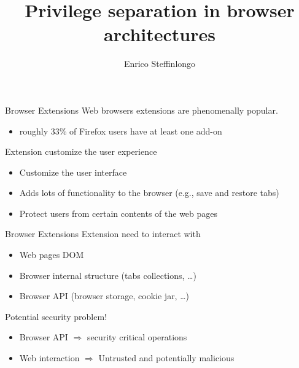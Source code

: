\documentclass[11pt]{beamer}
\author{Enrico Steffinlongo}
\title{Privilege separation in browser architectures}
\institute[Universities Here and There] %
{
  Università Ca' Foscari - Computer science
}
\begin{document}
\begin{frame}
\titlepage
\end{frame}


\begin{frame}
\tableofcontents
\end{frame}

\begin{frame}{Browser Extensions}
Web browsers extensions are phenomenally popular.
\begin{itemize}
\item roughly 33\% of Firefox users have at least one add-on
\end{itemize}
Extension customize the user experience
\begin{itemize}
\item Customize the user interface
\item Adds lots of functionality to the browser (e.g., save and restore tabs)
\item Protect users from certain contents of the web pages 
\end{itemize}
\end{frame}

\begin{frame}{Browser Extensions}
Extension need to interact with
\begin{itemize}
\item Web pages DOM
\item Browser internal structure (tabs collections, \dots)
\item Browser API (browser storage, cookie jar, \dots)
\end{itemize}
Potential security problem!
\begin{itemize}
\item Browser API $\Rightarrow$ security critical operations\\
\item Web interaction $\Rightarrow$ Untrusted and potentially malicious\\
\end{itemize}
\end{frame}
\end{document}
